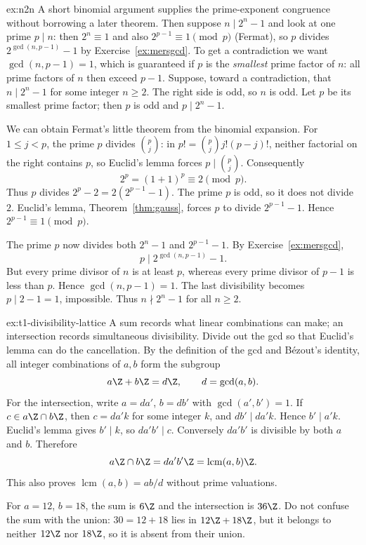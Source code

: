 \begin{solution}{ex:n2n}
\idea A short binomial argument supplies the prime-exponent congruence without borrowing a later theorem. Then suppose $n\mid2^n-1$ and look at one prime $p\mid n$: then $2^n\equiv1$ and also $2^{p-1}\equiv1\pmod p$ (Fermat), so $p$ divides $2^{\gcd(n,p-1)}-1$ by Exercise~\ref{ex:mersgcd}. To get a contradiction we want $\gcd(n,p-1)=1$, which is guaranteed if $p$ is the \emph{smallest} prime factor of $n$: all prime factors of $n$ then exceed $p-1$.
\writeup Suppose, toward a contradiction, that $n\mid2^n-1$ for some integer $n\ge2$. The right side is odd, so $n$ is odd. Let $p$ be its smallest prime factor; then $p$ is odd and $p\mid2^n-1$.

We can obtain Fermat's little theorem from the binomial expansion. For $1\le j<p$, the prime $p$ divides $\binom pj$: in $p!=\binom pj j!(p-j)!$, neither factorial on the right contains $p$, so Euclid's lemma forces $p\mid\binom pj$. Consequently
\[
2^p=(1+1)^p\equiv2\pmod p.
\]
Thus $p$ divides $2^p-2=2(2^{p-1}-1)$. The prime $p$ is odd, so it does not divide $2$. Euclid's lemma, Theorem~\ref{thm:gauss}, forces $p$ to divide $2^{p-1}-1$. Hence $2^{p-1}\equiv1\pmod p$.

The prime $p$ now divides both $2^n-1$ and $2^{p-1}-1$. By Exercise~\ref{ex:mersgcd},
\[
p\mid2^{\gcd(n,p-1)}-1.
\]
But every prime divisor of $n$ is at least $p$, whereas every prime divisor of $p-1$ is less than $p$. Hence $\gcd(n,p-1)=1$. The last divisibility becomes $p\mid2-1=1$, impossible. Thus $n\nmid2^n-1$ for all $n\ge2$.
\end{solution}

\begin{solution}{ex:t1-divisibility-lattice}
\idea A sum records what linear combinations can make; an intersection records simultaneous divisibility. Divide out the gcd so that Euclid's lemma can do the cancellation.
\writeup By the definition of the gcd and B\'ezout's identity, all integer combinations of $a,b$ form the subgroup
\[
a\Z+b\Z=d\Z,\qquad d=\gcd(a,b).
\]
For the intersection, write $a=da'$, $b=db'$ with $\gcd(a',b')=1$. If $c\in a\Z\cap b\Z$, then $c=da'k$ for some integer $k$, and $db'\mid da'k$. Hence $b'\mid a'k$. Euclid's lemma gives $b'\mid k$, so $da'b'\mid c$. Conversely $da'b'$ is divisible by both $a$ and $b$. Therefore
\[
a\Z\cap b\Z=da'b'\Z=\operatorname{lcm}(a,b)\Z.
\]
This also proves $\operatorname{lcm}(a,b)=ab/d$ without prime valuations.

For $a=12$, $b=18$, the sum is $6\Z$ and the intersection is $36\Z$. Do not confuse the sum with the union: $30=12+18$ lies in $12\Z+18\Z$, but it belongs to neither $12\Z$ nor $18\Z$, so it is absent from their union.
\end{solution}

